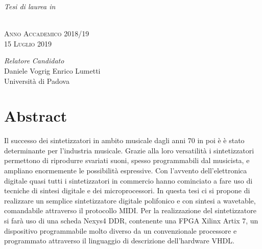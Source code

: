 \documentclass[italian,11pt,a4paper,twoside,openright]{book}
\begin{document}
\begin{center}
	\vspace{5pt}
	\small{\textit{Tesi di laurea in}}
	\@mastername
	
	
	\vspace{40pt}
	\scshape{\LARGE{\bfseries{\textcolor{SchoolColor}{\thetitle}}}} \normalsize \\
	\vspace{25pt}
	\vspace{15pt}
	\scshape{Anno Accademico 2018/19} \\
	\scshape{15 Luglio 2019}
	
	\vfill
	\begin{normalsize}
		\begin{flushleft}
			\textit{Relatore} \hfill \textit{Candidato}\\
			\vspace{1pt}
			Daniele Vogrig \hfill Enrico Lumetti\\
			Università di Padova \\
			\vspace{6pt}
			
		\end{flushleft}
	\end{normalsize}
	
\end{center}
\vspace*{\fill}
\singlespacing
{} 
\cleardoublepage

\chapter*{Abstract}
Il successo dei sintetizzatori in ambito musicale dagli anni 70 in poi è
è stato determinante per l'industria musicale. Grazie alla loro versatilità
i sintetizzatori permettono di riprodurre svariati suoni, spesso
programmabili dal musicista, e ampliano enormemente le possibilità espressive.
Con l'avvento dell'elettronica digitale quasi tutti i sintetizzatori in
commercio hanno cominciato a fare uso di tecniche di sintesi digitale e
dei microprocessori.
In questa tesi ci si propone di realizzare un semplice sintetizzatore 
digitale polifonico e con sintesi a wavetable, comandabile attraverso
il protocollo MIDI.
Per la realizzazione del sintetizzatore si farà uso di una scheda
Nexys4 DDR, contenente una FPGA Xilinx Artix 7, un dispositivo programmabile
molto diverso da un convenzionale processore e programmato attraverso
il linguaggio di descrizione dell'hardware VHDL.

\tableofcontents
\mainmatter








\backmatter
\end{document}

